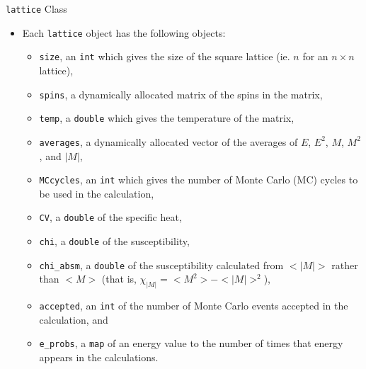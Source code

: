 \documentclass{beamer} %
\begin{document}
\begin{frame}{\texttt{lattice} Class}
\begin{itemize}
\item Each \texttt{lattice} object has the following objects:
\begin{itemize}
\item \texttt{size}, an \texttt{int} which gives the size of the square lattice (ie. $n$ for an $n\times n$ lattice),
\item \texttt{spins}, a dynamically allocated matrix of the spins in the matrix,
\item \texttt{temp}, a \texttt{double} which gives the temperature of the matrix,
\item \texttt{averages}, a dynamically allocated vector of the averages of $E$, $E^{2}$, $M$, $M^{2}$, and $|M|$,
\item \texttt{MCcycles}, an \texttt{int} which gives the number of Monte Carlo (MC) cycles to be used in the calculation,
\item \texttt{CV}, a \texttt{double} of the specific heat,
\item \texttt{chi}, a \texttt{double} of the susceptibility,
\item \texttt{chi\_absm}, a \texttt{double} of the susceptibility calculated from $<|M|>$ rather than $<M>$ (that is, $\chi_{|M|}=<M^{2}>-<|M|>^{2}$),
\item \texttt{accepted}, an \texttt{int} of the number of Monte Carlo events accepted in the calculation, and
\item \texttt{e\_probs}, a \texttt{map} of an energy value to the number of times that energy appears in the calculations.
\end{itemize}
\end{itemize}
\end{frame}
\end{document}
